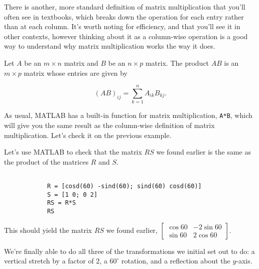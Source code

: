 \documentclass{ximera}
\begin{document}
\begin{exploration}
\begin{remark}
\begin{definition}
        \end{definition}

        There is another, more standard definition of matrix multiplication that you'll often see in textbooks, which breaks down the operation for each entry rather than at each column. It's worth noting for efficiency, and that you'll see it in other contexts, however thinking about it as a column-wise operation is a good way to understand why matrix multiplication works the way it does.

        \begin{definition}

            Let $A$ be an $m\times n$ matrix and $B$ be an $n\times p$ matrix. The product $AB$ is an $m\times p$ matrix whose entries are given by 

            $$(AB)_{ij}=\sum_{k=1}^n A_{ik}B_{kj}.$$
        \end{definition}

    \end{remark}

    As usual, MATLAB has a built-in function for matrix multiplication, \texttt{A*B}, which will give you the same result as the column-wise definition of matrix multiplication. Let's check it on the previous example.

    \begin{example}

        Let's use MATLAB to check that the matrix $RS$ we found earlier is the same as the product of the matrices $R$ and $S$.

        \begin{verbatim}

            R = [cosd(60) -sind(60); sind(60) cosd(60)]
            S = [1 0; 0 2]
            RS = R*S
            RS
        \end{verbatim}

        This should yield the matrix $RS$ we found earlier, $\begin{bmatrix} \cos 60 & -2\sin 60 \\ \sin 60 & 2\cos 60 \end{bmatrix}$.
    \end{example}

    \begin{example}

        We're finally able to do all three of the transformations we initial set out to do: a vertical stretch by a factor of $2$, a $60^\circ$ rotation, and a reflection about the $y$-axis.


\end{example}
\end{exploration}
\end{document}
